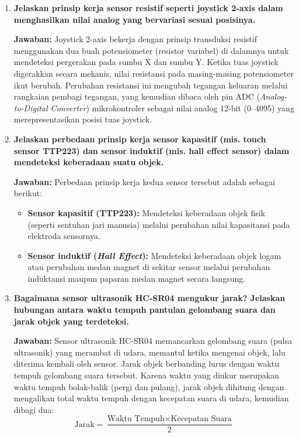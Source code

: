\begin{enumerate}
    \item \textbf{Jelaskan prinsip kerja sensor resistif seperti joystick 2-axis dalam menghasilkan nilai analog yang bervariasi sesuai posisinya.}

    \textbf{Jawaban:} Joystick 2-axis bekerja dengan prinsip transduksi resistif menggunakan dua buah potensiometer (resistor variabel) di dalamnya untuk mendeteksi pergerakan pada sumbu X dan sumbu Y. Ketika tuas joystick digerakkan secara mekanis, nilai resistansi pada masing-masing potensiometer ikut berubah. Perubahan resistansi ini mengubah tegangan keluaran melalui rangkaian pembagi tegangan, yang kemudian dibaca oleh pin ADC (\textit{Analog-to-Digital Converter}) mikrokontroler sebagai nilai analog 12-bit (0--4095) yang merepresentasikan posisi tuas joystick.

    \item \textbf{Jelaskan perbedaan prinsip kerja sensor kapasitif (mis. touch sensor TTP223) dan sensor induktif (mis. hall effect sensor) dalam mendeteksi keberadaan suatu objek.}

    \textbf{Jawaban:} Perbedaan prinsip kerja kedua sensor tersebut adalah sebagai berikut:
    \begin{itemize}
        \item \textbf{Sensor kapasitif (TTP223):} Mendeteksi keberadaan objek fisik (seperti sentuhan jari manusia) melalui perubahan nilai kapasitansi pada elektroda sensornya.
        \item \textbf{Sensor induktif (\textit{Hall Effect}):} Mendeteksi keberadaan objek logam atau perubahan medan magnet di sekitar sensor melalui perubahan induktansi maupun paparan medan magnet secara langsung.
    \end{itemize}

    \item \textbf{Bagaimana sensor ultrasonik HC-SR04 mengukur jarak? Jelaskan hubungan antara waktu tempuh pantulan gelombang suara dan jarak objek yang terdeteksi.}

    \textbf{Jawaban:} Sensor ultrasonik HC-SR04 memancarkan gelombang suara (pulsa ultrasonik) yang merambat di udara, memantul ketika mengenai objek, lalu diterima kembali oleh sensor. Jarak objek berbanding lurus dengan waktu tempuh gelombang suara tersebut. Karena waktu yang diukur merupakan waktu tempuh bolak-balik (pergi dan pulang), jarak objek dihitung dengan mengalikan total waktu tempuh dengan kecepatan suara di udara, kemudian dibagi dua:
    \[
        \text{Jarak} = \frac{\text{Waktu Tempuh} \times \text{Kecepatan Suara}}{2}
    \]


\end{enumerate}

